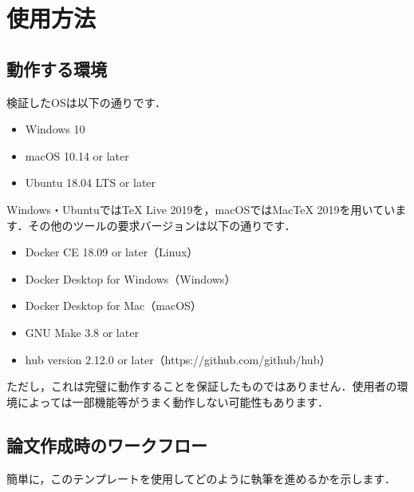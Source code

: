 \documentclass[../main]{subfiles}
\begin{document}
\section{使用方法}

\subsection{動作する環境}

検証したOSは以下の通りです．

\begin{itemize}
    \item Windows 10
    \item macOS 10.14 or later
    \item Ubuntu 18.04 LTS or later
\end{itemize}

Windows・UbuntuではTeX Live 2019を，macOSではMacTeX 2019を用いています．その他のツールの要求バージョンは以下の通りです．

\begin{itemize}
    \item Docker CE 18.09 or later（Linux）
    \item Docker Desktop for Windows（Windows）
    \item Docker Desktop for Mac（macOS）
    \item GNU Make 3.8 or later
    \item hub version 2.12.0 or later（https://github.com/github/hub）
\end{itemize}

ただし，これは完璧に動作することを保証したものではありません．使用者の環境によっては一部機能等がうまく動作しない可能性もあります．

\subsection{論文作成時のワークフロー}

簡単に，このテンプレートを使用してどのように執筆を進めるかを示します．
\end{document}
